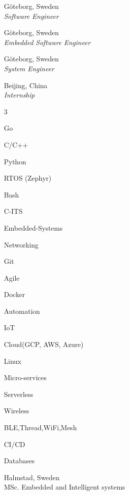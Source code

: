 \documentclass[a4paper,12pt,final]{memoir}
\begin{document}
 \hfill G\"oteborg, Sweden \\
\emph{Software Engineer}
\SmallSep

 \hfill G\"oteborg, Sweden \\
\emph{Embedded Software Engineer}
\SmallSep

 \hfill G\"oteborg, Sweden \\
\emph{System Engineer}
\SmallSep

 \hfill Beijing, China \\
\emph{Internship}
\Sep


	
\begin{multicols}{3}
\begin{compactitem}[\color{RoyalBlue}$\circ$]
	\item Go
	\item C/C++ 
	\item Python
	\item RTOS (Zephyr) 
	\item Bash
	\item C-ITS
	\item Embedded-Systems
	\item Networking
	\item Git
	\item Agile 
	\item Docker
	\item Automation
	\item IoT
	\item Cloud(GCP, AWS, Azure)
	\item Linux
	\item Micro-services
	\item Serverless
	\item Wireless
	\item BLE,Thread,WiFi,Mesh
	\item CI/CD
	\item Databases
\end{compactitem}
\end{multicols}

\Sep

 \hfill Halmstad, Sweden \\
MSc. Embedded and Intelligent systems
\SmallSep
\end{document}
